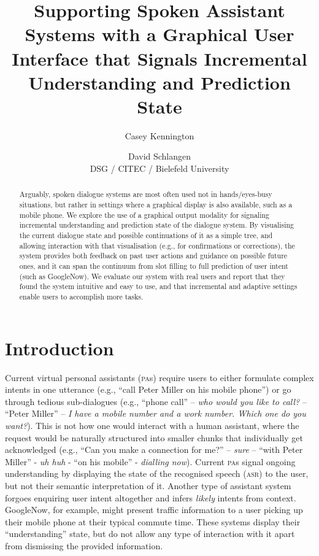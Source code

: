 \documentclass[11pt]{article}
\title{Supporting Spoken Assistant Systems with a Graphical User\\ Interface that Signals Incremental Understanding and Prediction State}
\author{Casey Kennington \and David Schlangen\\DSG / CITEC / Bielefeld University}
\newcommand{\asr}[0]{\textsc{asr}}
\newcommand{\pa}[0]{\textsc{pa}}
\begin{document}

\maketitle

\begin{abstract}
Arguably, spoken dialogue systems are most often used not in hands/eyes-busy situations, but rather in settings where a graphical display is also available, such as a mobile phone. We explore the use of a graphical output modality for signaling incremental understanding and prediction state of the dialogue system. By visualising the current dialogue state and possible continuations of it as a simple tree, and allowing interaction with that visualisation (e.g., for confirmations or corrections), the system provides both feedback on past user actions and guidance on possible future ones, and it can span the continuum from slot filling to full prediction of user intent (such as GoogleNow). We evaluate our system with real users and report that they found the system intuitive and easy to use, and that incremental and adaptive settings enable users to accomplish more tasks.
\end{abstract}

\section{Introduction}
\label{section:intro}

Current virtual personal assistants (\pa s) require users to either formulate complex intents in one utterance (e.g., ``call Peter Miller on his mobile phone'') or go through tedious sub-dialogues (e.g., ``phone call'' -- \emph{who would you like to call?} -- ``Peter Miller'' -- \emph{I have a mobile number and a work number. Which one do you want?}). This is not how one would interact with a human assistant, where the request would be naturally structured into smaller chunks that individually get acknowledged (e.g., ``Can you make a connection for me?'' -- \emph{sure} -- ``with Peter Miller'' - \emph{uh huh} - ``on his mobile'' - \emph{dialling now}). Current \pa s signal ongoing understanding by displaying the state of the recognised speech (\asr) to the user, but not their semantic interpretation of it. Another type of assistant system forgoes enquiring user intent altogether and infers \emph{likely} intents from context. GoogleNow, for example, might present traffic information to a user picking up their mobile phone at their typical commute time. These systems display their ``understanding'' state, but do not allow any type of interaction with it apart from dismissing the provided information.
\end{document}
